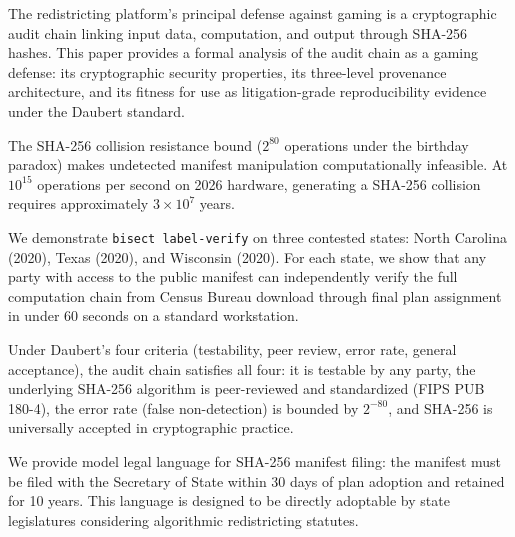 The \bisect{} redistricting platform's principal defense against gaming
is a cryptographic audit chain linking input data, computation, and output
through SHA-256 hashes.
This paper provides a formal analysis of the audit chain as a gaming defense:
its cryptographic security properties, its three-level provenance architecture,
and its fitness for use as litigation-grade reproducibility evidence under
the Daubert standard.

The SHA-256 collision resistance bound ($2^{80}$ operations under the
birthday paradox) makes undetected manifest manipulation computationally
infeasible.
At $10^{15}$ operations per second on 2026 hardware, generating a
SHA-256 collision requires approximately $3 \times 10^7$ years.

We demonstrate \texttt{bisect label-verify} on three contested states:
North Carolina (2020), Texas (2020), and Wisconsin (2020).
For each state, we show that any party with access to the public manifest
can independently verify the full computation chain from Census Bureau
download through final plan assignment in under 60 seconds on a
standard workstation.

Under Daubert's four criteria (testability, peer review, error rate,
general acceptance), the \bisect{} audit chain satisfies all four:
it is testable by any party, the underlying SHA-256 algorithm is
peer-reviewed and standardized (FIPS PUB 180-4), the error rate
(false non-detection) is bounded by $2^{-80}$, and SHA-256 is
universally accepted in cryptographic practice.

We provide model \dia{} legal language for SHA-256 manifest filing:
the manifest must be filed with the Secretary of State within 30 days
of plan adoption and retained for 10 years.
This language is designed to be directly adoptable by state legislatures
considering algorithmic redistricting statutes.
